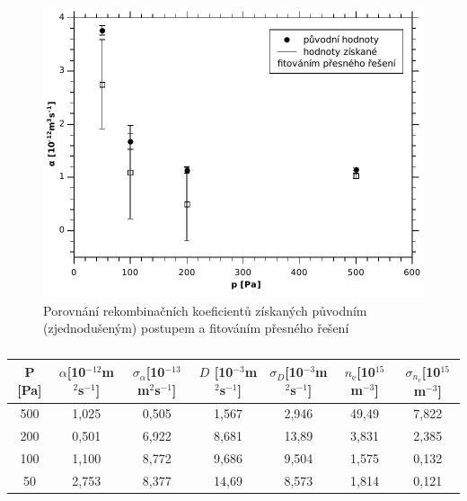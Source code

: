 \documentclass[12pt]{article}
\begin{document}
\begin{figure}[htbp]
\begin{center}
\includegraphics[width=12cm]{rekombfinal.pdf}
\caption{Porovnání rekombinačních koeficientů získaných původním (zjednodušeným) postupem a fitováním přesného řešení}
\label{rekombfinal}
\end{center}
\end{figure}

\begin{table}[htbp]
\begin{center}
\begin{tabular}{|c|c|c|c|c|c|c|}
\hline
P [Pa] & $\alpha$[10$^{-12}$m$^2$s$^{-1}$] & $\sigma_\alpha$[10$^{-13}$m$^2$s$^{-1}$] & $D$ [10$^{-3}$m$^2$s$^{-1}$] & $\sigma_D$[10$^{-3}$m$^2$s$^{-1}$] & $n_{\mathrm{e}}$[10$^{15}$m$^{-3}$] & $\sigma_{n_{\mathrm{e}}}$[10$^{15}$m$^{-3}$] \\ \hline
500 & 1,025 & 0,505 & 1,567& 2,946 & 49,49 & 7,822  \\ \hline
200 & 0,501 & 6,922 & 8,681 & 13,89 & 3,831 & 2,385  \\ \hline
100 & 1,100 & 8,772 & 9,686 & 9,504 & 1,575 & 0,132  \\ \hline
50 & 2,753 & 8,377 & 14,69 & 8,573 & 1,814 & 0,121 \\ \hline
\end{tabular}
\end{center}
\caption{}
\label{}
\end{table}

\newpage
\end{document}
